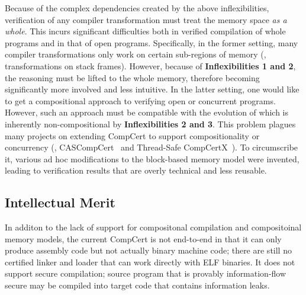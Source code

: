 Because of the complex dependencies created by the above
inflexibilities, verification of any compiler transformation must
treat the memory space \emph{as a whole}. This incurs significant
difficulties both in verified compilation of whole programs and in
that of open programs. Specifically, in the former setting, many
compiler transformations only work on certain sub-regions of memory
(\eg, transformations on stack frames). However, because of
\textbf{Inflexibilities 1 and 2}, the reasoning must be lifted to the
whole memory, therefore becoming significantly more involved and less
intuitive. In the latter setting, one would like to get a
compositional approach to verifying open or concurrent
programs. However, such an approach must be compatible with the
evolution of \nextblock which is inherently non-compositional by
\textbf{Inflexibilities 2 and 3}. This problem plagues many projects on
extending CompCert to support compositionality or concurrency (\eg,
CASCompCert~\cite{cascompcert} and Thread-Safe
CompCertX~\cite{ccal18}). To circumscribe it, various ad hoc
modifications to the block-based memory model were invented, leading to
verification results that are overly technical and less reusable.



\subsection{Intellectual Merit}
\label{ssec:intro-itm}

In additon to the lack of support for compositonal compilation and
compositoinal memory models, the current CompCert is not end-to-end in
that it can only produce assembly code but not actually binary machine
code; there are still no certified linker and loader that can work
directly with ELF binaries.  It does not support secure compilation;
source program that is provably information-flow secure may be
compiled into target code that contains information leaks.

